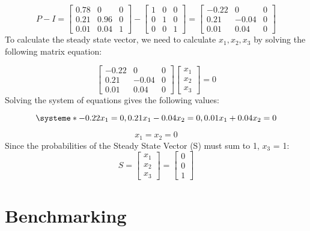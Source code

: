 \documentclass{article}
\begin{document}
\begin{equation*}
P - I = 
\begin{bmatrix}
0.78 & 0 & 0 \\
0.21 & 0.96 & 0 \\
0.01 & 0.04 & 1
\end{bmatrix}
-
\begin{bmatrix}
1 & 0 & 0 \\
0 & 1 & 0 \\
0 & 0 & 1
\end{bmatrix}
=
\begin{bmatrix}
-0.22 & 0 & 0 \\
0.21 & -0.04 & 0 \\
0.01 & 0.04 & 0
\end{bmatrix}
\end{equation*}
To calculate the steady state vector, we need to calculate  ${x_1}, {x_2}, {x_3}$ by solving the following matrix equation:

\begin{equation*}
\begin{bmatrix}
-0.22 & 0 & 0 \\
0.21 & -0.04 & 0 \\
0.01 & 0.04 & 0
\end{bmatrix}
\begin{bmatrix}
x_1 \\
x_2 \\
x_3
\end{bmatrix}
= 0 
\end{equation*}
Solving the system of equations gives the following values:

\[
\systeme*{-0.22x_1 = 0, 0.21x_1 - 0.04x_2 = 0, 0.01x_1 + 0.04x_2 = 0}
\]

\begin{equation*}
x_1 = x_2 = 0
\end{equation*}
Since the probabilities of the Steady State Vector (S) must sum to 1, $x_3$ = 1:
\begin{equation*}
S =
\begin{bmatrix}
x_1 \\
x_2 \\
x_3
\end{bmatrix}
=
\begin{bmatrix}
0 \\
0 \\
1
\end{bmatrix}
\end{equation*}

\section{Benchmarking}
\end{document}
